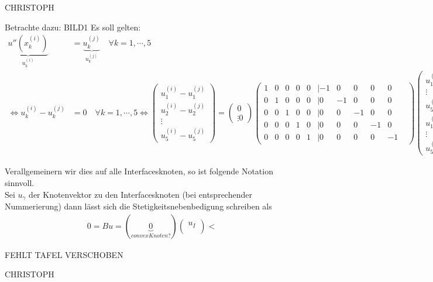 CHRISTOPH

Betrachte dazu:
BILD1
Es soll gelten: 
\begin{align}
  \underbrace{u''(x^{(i)}_k)}_{u_k^{(i)}} &= \underbrace{u^{(j)}_k}_{u_k^{(j)}} \quad \forall k=1,\cdots,5\\
  \Leftrightarrow u_k^{(i)} - u^{(j)}_k &= 0 \quad \forall k=1,\cdots,5
  \Leftrightarrow 

  \begin{pmatrix}
    u_1^{(i)}-u_1^{(j)}\\
    u_2^{(i)}-u_2^{(j)}\\
    \vdots\\
    u_5^{(i)}-u_5^{(j)}  
  \end{pmatrix}
  =
  \begin{pmatrix}
    0\\ \vdots 0
  \end{pmatrix}

  \begin{pmatrix}
    1& 0& 0& 0& 0& | -1& 0& 0& 0& 0&\\
    0& 1& 0& 0& 0& | 0& -1& 0& 0& 0&\\
    0& 0& 1& 0& 0& | 0& 0& -1& 0& 0&\\
    0& 0& 0& 1& 0& | 0& 0& 0& -1& 0&\\
    0& 0& 0& 0& 1& | 0& 0& 0& 0& -1&
  \end{pmatrix}
  \begin{pmatrix}
    u^{(i)}_1\\
    \vdots\\
    u^{(i)}_5\\
    u^{(j)}_1\\
    \vdots\\
    u^{(j)}_5
  \end{pmatrix}
  = 

  \Leftrightarrow
  
  (B^{(i)} B^{(j)}) %
  \begin{pmatrix}
    u^{(i)}\\
    u^{(j)}
  \end{pmatrix}
  =
  \begin{pmatrix}
    0\\
    0
  \end{pmatrix}

  \Leftrightarrow 

  Bu=0
\end{align}

Verallgemeinern wir dies auf alle Interfacesknoten, so ist folgende Notation sinnvoll. \\
Sei $u_\gamma$ der Knotenvektor zu den Interfacesknoten (bei entsprechender Nummerierung) dann lässt sich die Stetigkeitsnebenbedigung schreiben als 
\begin{align}
  0 = Bu = (\underbrace{0}_{convex Knoten?})
  \begin{pmatrix}
    u_I\\
    
  \end{pmatrix}<
  \label{}
\end{align}

FEHLT TAFEL VERSCHOBEN

CHRISTOPH


